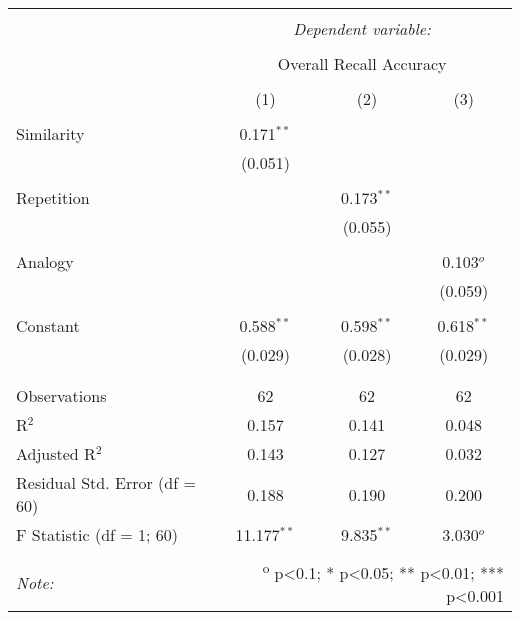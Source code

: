 
\begin{table}[!htbp] \centering
  \caption{}
  \label{table:fol2}
  \small
  \renewcommand{\arraystretch}{0.6}
\begin{tabular}{@{\extracolsep{5pt}}lccc}
\\[-1.8ex]\hline
\hline \\[-1.8ex]
 & \multicolumn{3}{c}{\textit{Dependent variable:}} \\
\cline{2-4}
\\[-1.8ex] & \multicolumn{3}{c}{Overall Recall Accuracy} \\
\\[-1.8ex] & (1) & (2) & (3)\\
\hline \\[-1.8ex]
 Similarity & 0.171$^{**}$ &  &  \\
  & (0.051) &  &  \\
  & & & \\
 Repetition &  & 0.173$^{**}$ &  \\
  &  & (0.055) &  \\
  & & & \\
 Analogy &  &  & 0.103$^{o}$ \\
  &  &  & (0.059) \\
  & & & \\
 Constant & 0.588$^{**}$ & 0.598$^{**}$ & 0.618$^{**}$ \\
  & (0.029) & (0.028) & (0.029) \\
  & & & \\
\hline \\[-1.8ex]
Observations & 62 & 62 & 62 \\
R$^{2}$ & 0.157 & 0.141 & 0.048 \\
Adjusted R$^{2}$ & 0.143 & 0.127 & 0.032 \\
Residual Std. Error (df = 60) & 0.188 & 0.190 & 0.200 \\
F Statistic (df = 1; 60) & 11.177$^{**}$ & 9.835$^{**}$ & 3.030$^{o}$ \\
\hline
\hline \\[-1.8ex]
\textit{Note:}  & \multicolumn{3}{r}{\textsuperscript{o} p<0.1; * p<0.05; ** p<0.01; *** p<0.001} \\
\end{tabular}
\end{table}

